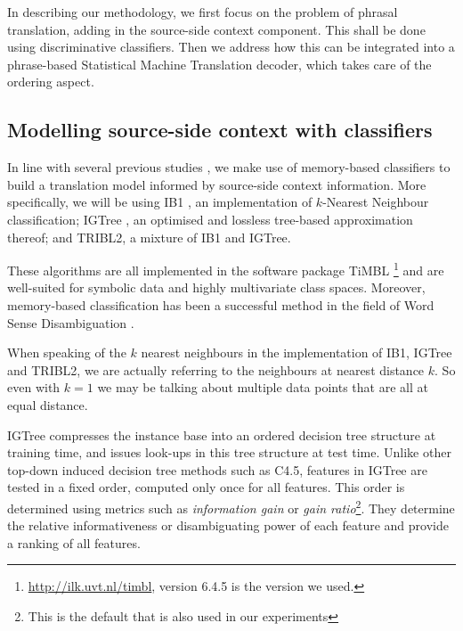 In describing our methodology, we first focus on the problem of phrasal
translation, adding in the source-side context component. This shall be done
using discriminative classifiers. Then we address how this can be integrated into a
phrase-based Statistical Machine Translation decoder, which takes care of
the ordering aspect. 


\subsection{Modelling source-side context with classifiers}

In line with several previous studies \citep{Rejwanul+11,PBMBMT,
  Stroppa+07,MARKERBASED}, we make use of memory-based classifiers to
build a translation model informed by source-side context
information. More specifically, we will be using IB1 \citep{IB1}, an
implementation of $k$-Nearest Neighbour classification; IGTree
\citep{IGTree}, an optimised and lossless tree-based approximation
thereof; and TRIBL2, a mixture of IB1 and IGTree.

These algorithms are all implemented in the software package TiMBL
\citep{TIMBL}\footnote{\url{http://ilk.uvt.nl/timbl}, version 6.4.5 is the
version we used.} and are well-suited for symbolic data and highly multivariate
class spaces.  Moreover, memory-based classification has been a successful
method in the field of Word Sense Disambiguation \citep{SENSEVAL2}.

When speaking of the $k$ nearest neighbours in the implementation of IB1,
IGTree and TRIBL2, we are actually referring to the neighbours at nearest
distance $k$. So even with $k=1$ we may be talking about multiple data points
that are all at equal distance.

IGTree compresses the instance base into an ordered decision tree structure at
training time, and issues look-ups in this tree structure at test time. Unlike
other top-down induced decision tree methods such as C4.5, features in IGTree
are tested in a fixed order, computed only once for all features. This order is
determined using metrics such as \emph{information gain} or \emph{gain
ratio}\footnote{This is the default that is also used in our experiments}. They
determine the relative informativeness or disambiguating power of each feature
and provide a ranking of all features. 

